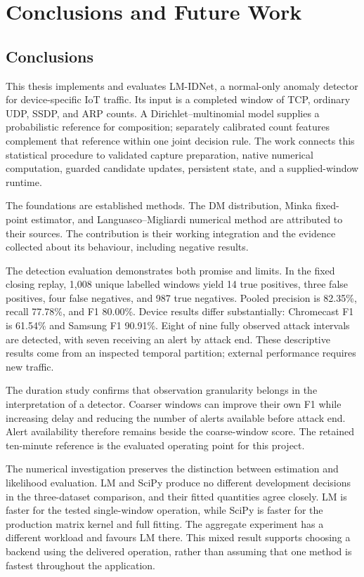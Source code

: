 \chapter{Conclusions and Future Work}
\label{ch:conclusions}
\section{Conclusions}

This thesis implements and evaluates LM-IDNet, a normal-only anomaly
detector for device-specific IoT traffic. Its input is a completed
window of TCP, ordinary UDP, SSDP, and ARP counts. A Dirichlet--multinomial
model supplies a probabilistic reference for composition; separately
calibrated count features complement that reference within one joint
decision rule. The work connects this statistical procedure to
validated capture preparation, native numerical computation, guarded
candidate updates, persistent state, and a supplied-window runtime.

The foundations are established methods. The DM distribution,
Minka fixed-point estimator, and Languasco--Migliardi numerical
method are attributed to their sources. The contribution is their
working integration and the evidence collected about its behaviour,
including negative results.

The detection evaluation demonstrates both promise and limits.
In the fixed closing replay, 1,008 unique labelled windows yield
14 true positives, three false positives, four false negatives,
and 987 true negatives. Pooled precision is 82.35\%, recall 77.78\%,
and F1 80.00\%. Device results differ substantially: Chromecast
F1 is 61.54\% and Samsung F1 90.91\%. Eight of nine fully observed
attack intervals are detected, with seven receiving an alert by
attack end. These descriptive results come from an inspected temporal
partition; external performance requires new traffic.

The duration study confirms that observation granularity belongs
in the interpretation of a detector. Coarser windows can improve
their own F1 while increasing delay and reducing the number of
alerts available before attack end. Alert availability therefore remains
beside the coarse-window score. The retained ten-minute reference is the
evaluated operating point for this project.

The numerical investigation preserves the distinction between
estimation and likelihood evaluation. LM and SciPy produce no
different development decisions in the three-dataset comparison,
and their fitted quantities agree closely. LM is faster for the
tested single-window operation, while SciPy is faster for the
production matrix kernel and full fitting. The aggregate experiment
has a different workload and favours LM there. This mixed result
supports choosing a backend using the delivered operation, rather
than assuming that one method is fastest throughout the application.

